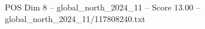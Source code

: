 \begin{textsample}{POS Dim 8 – global\_north\_2024\_11 – Score 13.00 – global\_north\_2024\_11/117808240.txt}
\end{textsample}
